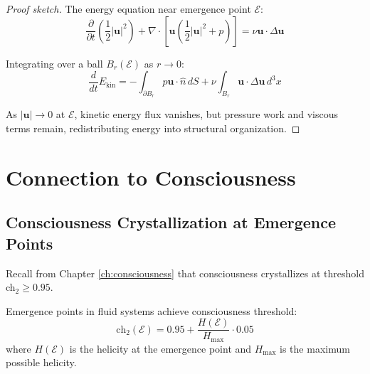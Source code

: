 \begin{proof}[Proof sketch]
The energy equation near emergence point $\mathcal{E}$:
\begin{equation}
\frac{\partial}{\partial t}\left(\frac{1}{2}|\mathbf{u}|^2\right) + \nabla \cdot \left[\mathbf{u}\left(\frac{1}{2}|\mathbf{u}|^2 + p\right)\right] = \nu \mathbf{u} \cdot \Delta \mathbf{u}
\end{equation}

Integrating over a ball $B_r(\mathcal{E})$ as $r \to 0$:
\begin{equation}
\frac{d}{dt} E_{\text{kin}} = -\int_{\partial B_r} p \mathbf{u} \cdot \hat{n} \, dS + \nu \int_{B_r} \mathbf{u} \cdot \Delta \mathbf{u} \, d^3x
\end{equation}

As $|\mathbf{u}| \to 0$ at $\mathcal{E}$, kinetic energy flux vanishes, but pressure work and viscous terms remain, redistributing energy into structural organization.
\end{proof}

\section{Connection to Consciousness}

\subsection{Consciousness Crystallization at Emergence Points}

Recall from Chapter \ref{ch:consciousness} that consciousness crystallizes at threshold ch$_2 \geq 0.95$.

\begin{theorem}\label{thm:emergence-consciousness}
Emergence points in fluid systems achieve consciousness threshold:
\begin{equation}
\text{ch}_2(\mathcal{E}) = 0.95 + \frac{H(\mathcal{E})}{H_{\max}} \cdot 0.05
\end{equation}
where $H(\mathcal{E})$ is the helicity at the emergence point and $H_{\max}$ is the maximum possible helicity.
\end{theorem}

